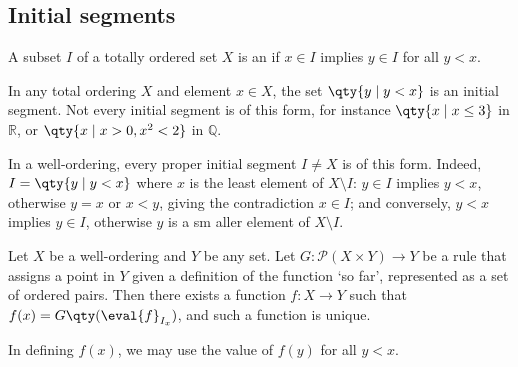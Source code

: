 \subsection{Initial segments}
\begin{definition}
    A subset $I$ of a totally ordered set $X$ is an  if $x \in I$ implies $y \in I$ for all $y < x$.
\end{definition}
\begin{example}
    In any total ordering $X$ and element $x \in X$, the set $\qty{y \mid y < x}$ is an initial segment.
    Not every initial segment is of this form, for instance $\qty{x \mid x \leq 3}$ in $\mathbb R$, or $\qty{x \mid x > 0, x^2 < 2}$ in $\mathbb Q$.

    In a well-ordering, every proper initial segment $I \neq X$ is of this form.
    Indeed, $I = \qty{y \mid y < x}$ where $x$ is the least element of $X \setminus I$: $y \in I$ implies $y < x$, otherwise $y = x$ or $x < y$, giving the contradiction $x \in I$; and conversely, $y < x$ implies $y \in I$, otherwise $y$ is a sm
    aller element of $X \setminus I$.
\end{example}
\begin{theorem}
    Let $X$ be a well-ordering and $Y$ be any set.
    Let $G \colon \mathcal P(X \times Y) \to Y$ be a rule that assigns a point in $Y$ given a definition of the function `so far', represented as a set of ordered pairs.
    Then there exists a function $f \colon X \to Y$ such that $f(x) = G\qty(\eval{f}_{I_x})$, and such a function is unique.
\end{theorem}

\begin{remark}
    In defining $f(x)$, we may use the value of $f(y)$ for all $y < x$.
\end{remark}

